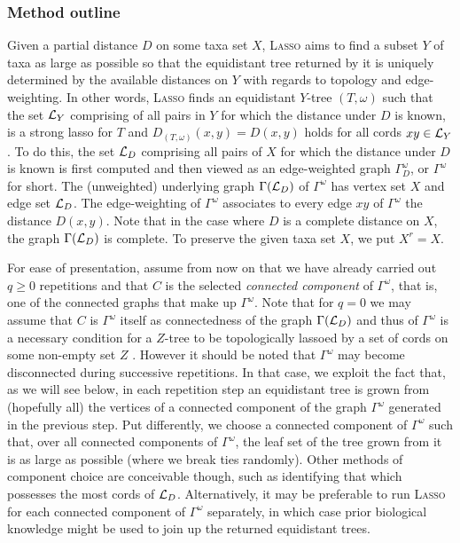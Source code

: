 \subsubsection{Method outline}
\label{sec:method-outline}

Given a partial distance $D$ on some taxa set $X$, \textsc{Lasso} aims to find a
subset $Y$ of taxa as large as possible so that the equidistant tree returned
by it is uniquely determined by the available distances on $Y$ with regards to
topology and edge-weighting.  In other words, \textsc{Lasso} finds an equidistant
$Y$-tree $(T,\omega) $ such that the set ${\mathcal L}_Y$ comprising of all pairs in
$Y$ for which the distance under $D$ is known, is a strong lasso for $T$ and
$D_{(T,\omega)}(x,y) =D(x,y)$ holds for all cords $xy\in {\mathcal L}_Y$.  To do this,
the set ${\mathcal L}_D$ comprising all pairs of $X$ for which the distance under $D$
is known is first computed and then viewed as an edge-weighted graph
$\Gamma_D^{\omega}$, or $\Gamma^{\omega}$ for short. The (unweighted)
underlying graph $\Gamma({\mathcal L}_D)$ of $\Gamma^{\omega}$ has vertex set $X$ and
edge set ${\mathcal L}_D$. The edge-weighting of $\Gamma^{\omega}$ associates to every
edge $xy$ of $\Gamma^{\omega}$ the distance $D(x,y)$.  Note that in the case
where $D$ is a complete distance on $X$, the graph $\Gamma({\mathcal L}_D)$ is
complete.  To preserve the given taxa set $X$, we put $X^r=X$.

For ease of presentation, assume from now on that we have already carried out
$q\geq 0$ repetitions and that $C$ is the selected {\em connected component}
of $\Gamma^{\omega}$, that is, one of the connected graphs that make up
$\Gamma^{\omega}$.  Note that for $q=0$ we may assume that $C$ is
$\Gamma^{\omega}$ itself as connectedness of the graph $\Gamma({\mathcal L}_D)$ and
thus of $\Gamma^{\omega}$ is a necessary condition for a $Z$-tree to be
topologically lassoed by a set of cords on some non-empty set $Z$
\cite{huber13lassoing}.  However it should be noted that $\Gamma^{\omega}$ may become
disconnected during successive repetitions.  In that case, we exploit the fact
that, as we will see below, in each repetition step an equidistant tree is
grown from (hopefully all) the vertices of a connected component of the graph
$\Gamma^{\omega}$ generated in the previous step. Put differently, we choose a
connected component of $\Gamma^{\omega}$ such that, over all connected
components of $\Gamma^{\omega}$, the leaf set of the tree grown from it is as
large as possible (where we break ties randomly). Other methods of component
choice are conceivable though, such as identifying that which possesses the
most cords of ${\mathcal L}_D$.  Alternatively, it may be preferable to run \textsc{Lasso}
for each connected component of $\Gamma^{\omega}$ separately, in which case
prior biological knowledge might be used to join up the returned equidistant
trees.

